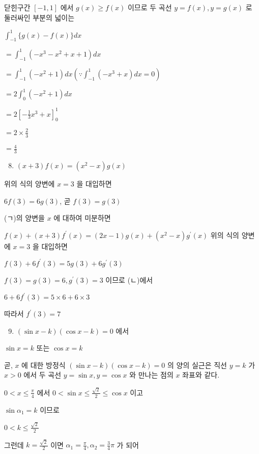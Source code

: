 \documentclass[10pt]{article}
\begin{document}
닫힌구간 \([-1,1]\) 에서 \(g(x) \geq f(x)\) 이므로 두 곡선 \(y=f(x), y=g(x)\) 로 둘러싸인 부분의 넓이는

\(\int_{-1}^{1}\{g(x)-f(x)\} d x\)

\(=\int_{-1}^{1}\left(-x^{3}-x^{2}+x+1\right) d x\)

\(=\int_{-1}^{1}\left(-x^{2}+1\right) d x\left(\because \int_{-1}^{1}\left(-x^{3}+x\right) d x=0\right)\)

\(=2 \int_{0}^{1}\left(-x^{2}+1\right) d x\)

\(=2\left[-\frac{1}{3} x^{3}+x\right]_{0}^{1}\)

\(=2 \times \frac{2}{3}\)

\(=\frac{4}{3}\)

\begin{enumerate}
  \setcounter{enumi}{7}
  \item \((x+3) f(x)=\left(x^{2}-x\right) g(x)\)
\end{enumerate}

위의 식의 양변에 \(x=3\) 을 대입하면

\(6 f(3)=6 g(3)\), 곧 \(f(3)=g(3)\)

(ㄱ)의 양변을 \(x\) 에 대하여 미분하면

\(f(x)+(x+3) f^{\prime}(x)=(2 x-1) g(x)+\left(x^{2}-x\right) g^{\prime}(x)\) 위의 식의 양변에 \(x=3\) 을 대입하면

\(f(3)+6 f^{\prime}(3)=5 g(3)+6 g^{\prime}(3)\)

\(f(3)=g(3)=6, g^{\prime}(3)=3\) 이므로 (ㄴ)에서

\(6+6 f^{\prime}(3)=5 \times 6+6 \times 3\)

따라서 \(f^{\prime}(3)=7\)

\begin{enumerate}
  \setcounter{enumi}{8}
  \item \((\sin x-k)(\cos x-k)=0\) 에서
\end{enumerate}

\(\sin x=k\) 또는 \(\cos x=k\)

곧, \(x\) 에 대한 방정식 \((\sin x-k)(\cos x-k)=0\) 의 양의 실근은 직선 \(y=k\) 가 \(x>0\) 에서 두 곡선 \(y=\sin x, y=\cos x\) 와 만나는 점의 \(x\) 좌표와 같다.

\(0<x \leq \frac{\pi}{4}\) 에서 \(0<\sin x \leq \frac{\sqrt{2}}{2} \leq \cos x\) 이고

\(\sin \alpha_{1}=k\) 이므로

\(0<k \leq \frac{\sqrt{2}}{2}\)

그런데 \(k=\frac{\sqrt{2}}{2}\) 이면 \(\alpha_{1}=\frac{\pi}{4}, \alpha_{2}=\frac{3}{4} \pi\) 가 되어
\end{document}
